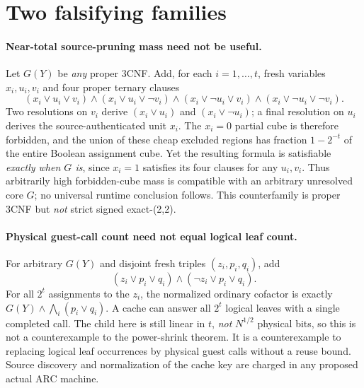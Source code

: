 \documentclass[11pt]{article}
\begin{document}
\section{Two falsifying families}
\paragraph{Near-total source-pruning mass need not be useful.}
Let $G(Y)$ be \emph{any} proper 3CNF. Add, for each $i=1,\dots,t$,
fresh variables $x_i,u_i,v_i$ and four proper ternary clauses
\[
 (x_i\vee u_i\vee v_i)\land(x_i\vee u_i\vee\neg v_i)
 \land(x_i\vee\neg u_i\vee v_i)
 \land(x_i\vee\neg u_i\vee\neg v_i).                         \tag{8}
\]
Two resolutions on $v_i$ derive $(x_i\vee u_i)$ and
$(x_i\vee\neg u_i)$; a final resolution on $u_i$ derives the
source-authenticated unit $x_i$. The $x_i=0$ partial cube is therefore
forbidden, and the union of these cheap excluded regions has fraction
$1-2^{-t}$ of the entire Boolean assignment cube. Yet the resulting formula
is satisfiable \emph{exactly when $G$ is}, since $x_i=1$ satisfies
its four clauses for any $u_i,v_i$. Thus arbitrarily high forbidden-cube
mass is compatible with an arbitrary unresolved core $G$; no universal
runtime conclusion follows. This counterfamily is proper 3CNF but \emph{not}
strict signed exact-(2,2).

\paragraph{Physical guest-call count need not equal logical leaf count.}
For arbitrary $G(Y)$ and disjoint fresh triples $(z_i,p_i,q_i)$, add
\[
 (z_i\vee p_i\vee q_i)\land(\neg z_i\vee p_i\vee q_i).
                                                                    \tag{9}
\]
For all $2^t$ assignments to the $z_i$, the normalized ordinary
cofactor is exactly $G(Y)\land\bigwedge_i(p_i\vee q_i)$. A cache can answer
all $2^t$ logical leaves with a single completed call. The child here
is still linear in $t$, \emph{not} $N^{1/2}$ physical bits, so this is
not a counterexample to the power-shrink theorem. It is a counterexample
to replacing logical leaf occurrences by physical guest calls without a
reuse bound. Source discovery and normalization of the cache key are
charged in any proposed actual ARC machine.
\end{document}
